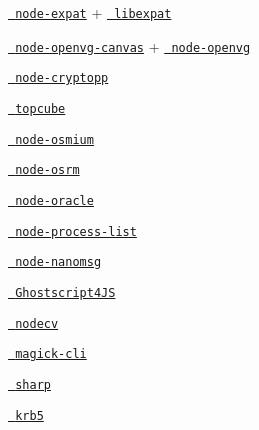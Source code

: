 \begin{DoxyItemize}
\item \href{https://github.com/astro/node-expat/blob/master/binding.gyp}{\texttt{ node-\/expat}} + \href{https://github.com/astro/node-expat/blob/master/deps/libexpat/libexpat.gyp}{\texttt{ libexpat}}
\item \href{https://github.com/luismreis/node-openvg-canvas/blob/master/binding.gyp}{\texttt{ node-\/openvg-\/canvas}} + \href{https://github.com/luismreis/node-openvg/blob/master/binding.gyp}{\texttt{ node-\/openvg}}
\item \href{https://github.com/BatikhSouri/node-cryptopp/blob/master/binding.gyp}{\texttt{ node-\/cryptopp}}
\item \href{https://github.com/creationix/topcube/blob/master/binding.gyp}{\texttt{ topcube}}
\item \href{https://github.com/osmcode/node-osmium/blob/master/binding.gyp}{\texttt{ node-\/osmium}}
\item \href{https://github.com/DennisOSRM/node-osrm}{\texttt{ node-\/osrm}}
\item \href{https://github.com/joeferner/node-oracle/blob/master/binding.gyp}{\texttt{ node-\/oracle}}
\item \href{https://github.com/ReklatsMasters/node-process-list/blob/master/binding.gyp}{\texttt{ node-\/process-\/list}}
\item \href{https://github.com/nickdesaulniers/node-nanomsg/blob/master/binding.gyp}{\texttt{ node-\/nanomsg}}
\item \href{https://github.com/NickNaso/ghostscript4js/blob/master/binding.gyp}{\texttt{ Ghostscript4\+JS}}
\item \href{https://github.com/xudafeng/nodecv/blob/master/binding.gyp}{\texttt{ nodecv}}
\item \href{https://github.com/NickNaso/magick-cli/blob/master/binding.gyp}{\texttt{ magick-\/cli}}
\item \href{https://github.com/lovell/sharp/blob/master/binding.gyp}{\texttt{ sharp}}
\item \href{https://github.com/adaltas/node-krb5/blob/master/binding.gyp}{\texttt{ krb5}} 
\end{DoxyItemize}